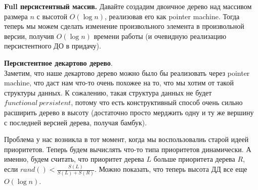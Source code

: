 \documentclass{article}
\newcommand{\tb}[1]{\textbf{#1}}
\begin{document}
\tb{Full персистентный массив.} Давайте создадим двоичное дерево над массивом размера $n$ с высотой $O(\log n)$, реализовав его как pointer machine. Тогда теперь мы можем сделать изменение произвольного элемента в произвольной версии, получив $O(\log n)$ времени работы (и очевидную реализацию персистентного ДО в придачу).

\tb{Персистентное декартово дерево}. \\

Заметим, что наше декартово дерево можно было бы реализовать через pointer machine, что даст нам что-то очень похожее на то, что мы хотим от такой структуры данных. К сожалению, такая структура данных не будет $functional\ persistent$, потому что есть конструктивный способ очень сильно расширить дерево в высоту (достаточно просто мерджить одну и ту же вершину с последней версией дерева, получая бамбук).

Проблема у нас возникла в тот момент, когда мы воспользовалиь старой идеей приоритетов. Теперь будем вычислять что-то типа приоритетов динамически. А именно, будем считать, что приоритет дерева $L$ больше приоритета дерева $R$, если $rand() < \frac{S(L)}{S(L) + S(R)}$. Можно показать, что теперь высота ДД все еще $O(\log n)$.
\end{document}
